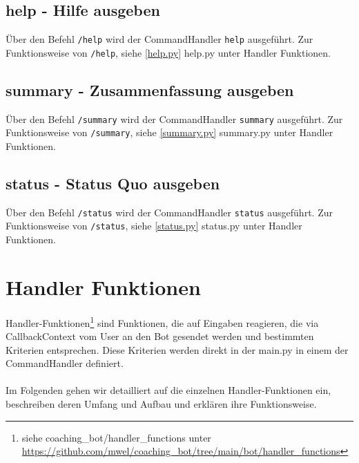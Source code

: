         \subsection{help - Hilfe ausgeben}
            Über den Befehl \verb|/help| wird der CommandHandler \verb|help| ausgeführt. Zur Funktionsweise von \verb|/help|, siehe \ref{help.py} help.py unter Handler Funktionen. 


        \subsection{summary - Zusammenfassung ausgeben}
            Über den Befehl \verb|/summary| wird der CommandHandler \verb|summary| ausgeführt. Zur Funktionsweise von \verb|/summary|, siehe \ref{summary.py} summary.py unter Handler Funktionen. 


        \subsection{status - Status Quo ausgeben}
            Über den Befehl \verb|/status| wird der CommandHandler \verb|status| ausgeführt. Zur Funktionsweise von \verb|/status|, siehe \ref{status.py} status.py unter Handler Funktionen. 


    \section{Handler Funktionen}
        Handler-Funktionen\footnote{siehe coaching\_bot/handler\_functions unter \url{https://github.com/mwel/coaching_bot/tree/main/bot/handler_functions}} sind Funktionen, die auf Eingaben reagieren, die via CallbackContext vom User an den Bot gesendet werden und bestimmten Kriterien entsprechen. Diese Kriterien werden direkt in der main.py in einem der CommandHandler definiert. \\
        \\
        Im Folgenden gehen wir detailliert auf die einzelnen Handler-Funktionen ein, beschreiben deren Umfang und Aufbau und erklären ihre Funktionsweise. 

